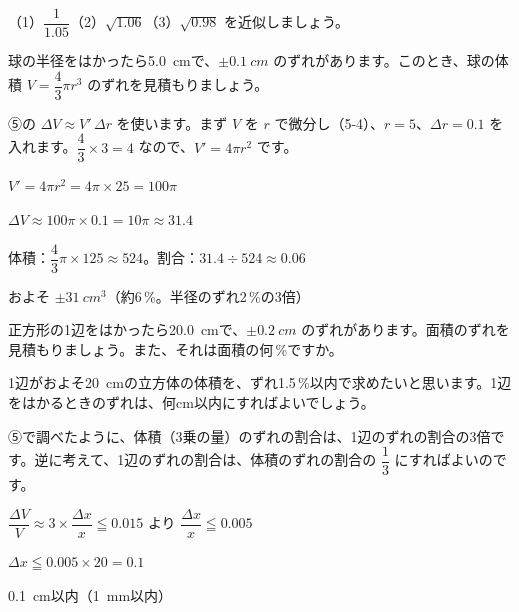 \begin{jibun}
（1）$\dfrac{1}{1.05}$\quad（2）$\sqrt{1.06}$\quad（3）$\sqrt{0.98}$ を近似しましょう。
\end{jibun}

\begin{reidai}[ずれの見積もり]
球の半径をはかったら\qty{5.0}{cm}で、$\pm\qty{0.1}{cm}$ のずれがあります。このとき、球の体積 $V=\dfrac{4}{3}\pi r^3$ のずれを見積もりましょう。\par
\kangaekata ⑤の $\Delta V\approx V'\,\Delta r$ を使います。まず $V$ を $r$ で微分し（5-4）、$r=5$、$\Delta r=0.1$ を入れます。$\dfrac{4}{3}\times3=4$ なので、$V'=4\pi r^2$ です。\par
\shiki $V'=4\pi r^2=4\pi\times25=100\pi$\par
\hspace*{2.6\zw}$\Delta V\approx100\pi\times0.1=10\pi\approx31.4$\par
\hspace*{2.6\zw}体積：$\dfrac{4}{3}\pi\times125\approx524$。割合：$31.4\div524\approx0.06$\par
\kotae およそ $\pm\qty{31}{cm^3}$（約6\,\%。半径のずれ2\,\%の3倍）
\end{reidai}

\begin{jibun}
正方形の1辺をはかったら\qty{20.0}{cm}で、$\pm\qty{0.2}{cm}$ のずれがあります。面積のずれを見積もりましょう。また、それは面積の何\,\%ですか。
\end{jibun}

\begin{reidai}
1辺がおよそ\qty{20}{cm}の立方体の体積を、ずれ1.5\,\%以内で求めたいと思います。1辺をはかるときのずれは、何cm以内にすればよいでしょう。\par
\kangaekata ⑤で調べたように、体積（3乗の量）のずれの割合は、1辺のずれの割合の3倍です。逆に考えて、1辺のずれの割合は、体積のずれの割合の $\dfrac{1}{3}$ にすればよいのです。\par
\shiki $\dfrac{\Delta V}{V}\approx3\times\dfrac{\Delta x}{x}\leqq0.015$ より $\dfrac{\Delta x}{x}\leqq0.005$\par
\hspace*{2.6\zw}$\Delta x\leqq0.005\times20=0.1$\par
\kotae \qty{0.1}{cm}以内（\qty{1}{mm}以内）
\end{reidai}

